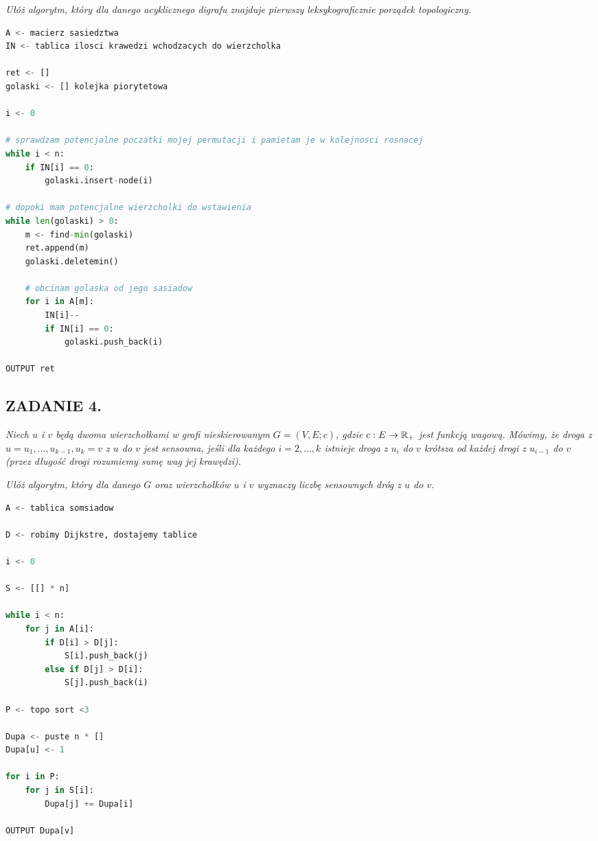 \documentclass{article}
\begin{document}
\emph{\color{pink}Ułóż algorytm, który dla danego acyklicznego digrafu znajduje pierwszy leksykograficznie porządek topologiczny.}
\smallskip

\begin{lstlisting}[language=Python]
A <- macierz sasiedztwa
IN <- tablica ilosci krawedzi wchodzacych do wierzcholka

ret <- []
golaski <- [] kolejka piorytetowa

i <- 0

# sprawdzam potencjalne poczatki mojej permutacji i pamietam je w kolejnosci rosnacej
while i < n:
    if IN[i] == 0:
        golaski.insert-node(i)

# dopoki mam potencjalne wierzcholki do wstawienia
while len(golaski) > 0:
    m <- find-min(golaski)
    ret.append(m)
    golaski.deletemin()

    # obcinam golaska od jego sasiadow
    for i in A[m]:
        IN[i]--
        if IN[i] == 0:
            golaski.push_back(i)
    
OUTPUT ret
\end{lstlisting}

\subsection*{ZADANIE 4.}
\emph{\color{pink}Niech $u$ i $v$ będą dwoma wierzchołkami w grafi nieskierowanym $G=(V, E; c)$, gdzie $c:E\to \mathbb{R}_+$ jest funkcją wagową. Mówimy, że droga z $u=u_1,...,u_{k-1},u_k=v$ z $u$ do $v$ jest sensowna, jeśli dla każdego $i=2,...,k$ istnieje droga z $u_i$ do $v$ krótsza od każdej drogi z $u_{i-1}$ do $v$ (przez długość drogi rozumiemy sumę wag jej krawędzi).}

\emph{\color{pink}Ułóż algorytm, który dla danego $G$ oraz wierzchołków $u$ i $v$ wyznaczy liczbę sensownych dróg z $u$ do $v$.}

\begin{lstlisting}[language=Python]
A <- tablica somsiadow

D <- robimy Dijkstre, dostajemy tablice

i <- 0

S <- [[] * n]

while i < n:
    for j in A[i]:
        if D[i] > D[j]:
            S[i].push_back(j)
        else if D[j] > D[i]:
            S[j].push_back(i)

P <- topo sort <3

Dupa <- puste n * []
Dupa[u] <- 1

for i in P:
    for j in S[i]:
        Dupa[j] += Dupa[i]

OUTPUT Dupa[v]
\end{lstlisting}
\end{document}

